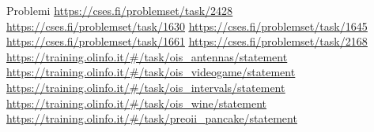 \documentclass[compress]{beamer}
\begin{document}
\begin{frame}{}
\end{frame}

\begin{frame}{}
\end{frame}

\begin{frame}{Problemi}
    \underline{\url{https://cses.fi/problemset/task/2428}}
    \underline{\url{https://cses.fi/problemset/task/1630}}
    \underline{\url{https://cses.fi/problemset/task/1645}}
    \underline{\url{https://cses.fi/problemset/task/1661}}
    \underline{\url{https://cses.fi/problemset/task/2168}}
    \underline{\url{https://training.olinfo.it/\#/task/ois_antennas/statement}}
    \underline{\url{https://training.olinfo.it/\#/task/ois_videogame/statement}}
    \underline{\url{https://training.olinfo.it/\#/task/ois_intervals/statement}}
    \underline{\url{https://training.olinfo.it/\#/task/ois_wine/statement}}
    \underline{\url{https://training.olinfo.it/\#/task/preoii_pancake/statement}}
\end{frame}
\end{document}
